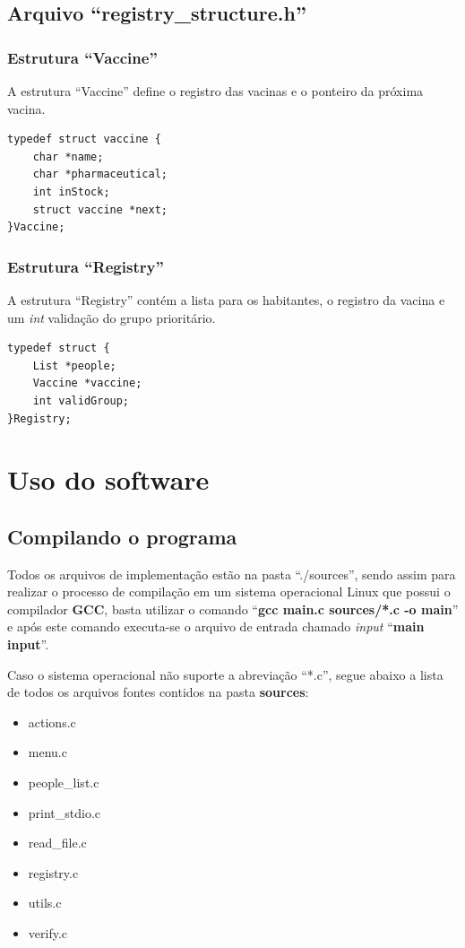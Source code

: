 \documentclass[12pt, a4paper]{article}
\begin{document}
\subsection{Arquivo ``registry\_structure.h''}\label{Arquivo ``registry''}
\subsubsection{Estrutura ``Vaccine''}\label{Estrutura ``Vaccine''}
A estrutura ``Vaccine'' define o registro das vacinas e o ponteiro da próxima vacina.
\begin{lstlisting}
typedef struct vaccine {
    char *name;
    char *pharmaceutical;
    int inStock;
    struct vaccine *next;
}Vaccine;
\end{lstlisting}
\subsubsection{Estrutura ``Registry''}\label{Estrutura ``Registry''}
A estrutura ``Registry'' contém a lista para os habitantes, o registro da vacina e um \textit{int} validação do grupo prioritário.
\begin{lstlisting}
typedef struct {
    List *people;
    Vaccine *vaccine;
    int validGroup;
}Registry;
\end{lstlisting}
\cleardoublepage
\section{Uso do software}\label{Uso do software}
\subsection{Compilando o programa}\label{Compilando o proograma}
Todos os arquivos de implementação estão na pasta ``./sources'', sendo assim para realizar o processo de compilação em um sistema operacional Linux que possui o compilador \textbf{GCC}, basta utilizar o comando ``\textbf{gcc main.c sources/*.c -o main}'' e após este comando executa-se o arquivo de entrada chamado \textit{input} ``\textbf{main input}''.

Caso o sistema operacional não suporte a abreviação ``*.c'', segue abaixo a lista de todos os arquivos fontes contidos na pasta \textbf{sources}:
\begin{itemize}
    \item actions.c
    \item menu.c
    \item people\_list.c
    \item print\_stdio.c
    \item read\_file.c
    \item registry.c
    \item utils.c
    \item verify.c
\end{itemize}
\end{document}
